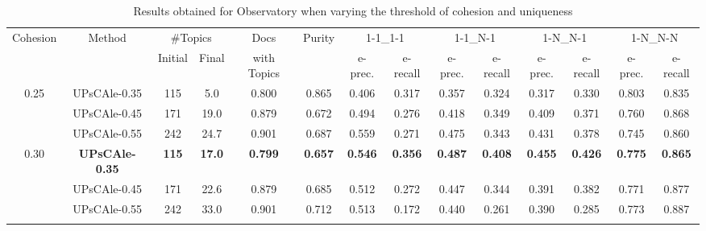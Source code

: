\begin{table*}
\begin{scriptsize}
\caption{Results obtained for Observatory when varying the threshold of cohesion and uniqueness}
\label{tbl:alfas}
\begin{tabular}{|c||c|c|c|c||c|c|c|c|c|c|c|c|c|}
\hline
\multirow{2}{*}{Cohesion}&\multirow{2}{*}{Method}&\multicolumn{2}{c|}{\#Topics}&Docs &\multirow{2}{*}{Purity}&\multicolumn{2}{|c|}{1-1\_1-1} &\multicolumn{2}{c|}{1-1\_N-1} &\multicolumn{2}{c|}{1-N\_N-1} &\multicolumn{2}{|c|}{1-N\_N-N}\\ \cline{3-4}\cline{7-14}
         		      &          &     Initial    &      Final       & with Topics    &  & e-prec.   & e-recall          & e-prec.   & e-recall          & e-prec.   & e-recall          & e-prec.   & e-recall          
\\ \hline \hline


\multirow{3}{*}{0.25} 
 & UPsCAle-0.35 & 115& 5.0 & 0.800 & 0.865 & 0.406 & 0.317 & 0.357 & 0.324 & 0.317 & 0.330 & 0.803 & 0.835
\\
 & UPsCAle-0.45 & 171 & 19.0 & 0.879 & 0.672 & 0.494 & 0.276 & 0.418 & 0.349 & 0.409 & 0.371 & 0.760 & 0.868
\\ 
 & UPsCAle-0.55 & 242& 24.7 & 0.901 & 0.687 & 0.559 & 0.271 & 0.475 & 0.343 & 0.431 & 0.378 & 0.745 & 0.860
\\ \hline

\multirow{3}{*}{0.30} 
 & \textbf{UPsCAle-0.35} & \textbf{115}&\textbf{17.0} & \textbf{0.799} & \textbf{0.657} &  \textbf{0.546} & \textbf{0.356} & \textbf{0.487} & \textbf{0.408} & \textbf{0.455} & \textbf{0.426 }& \textbf{0.775} & \textbf{0.865}
\\ 
 & UPsCAle-0.45 & 171&22.6 &0.879 & 0.685 &  0.512 & 0.272 & 0.447 & 0.344 & 0.391 & 0.382 & 0.771 & 0.877
\\ 
 & UPsCAle-0.55 & 242&33.0 &0.901 & 0.712 &  0.513 & 0.172 & 0.440 & 0.261 & 0.390 & 0.285 & 0.773 & 0.887
\\ \hline{}


\end{tabular}
\end{scriptsize}
\end{table*}
